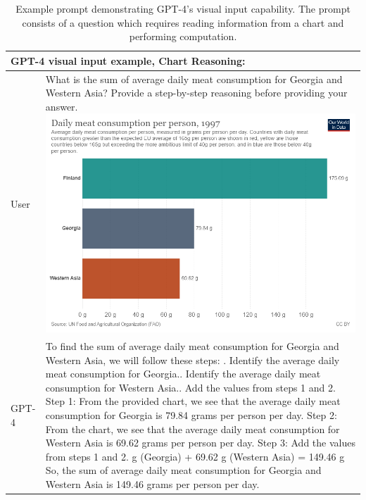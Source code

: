 \documentclass{article}
\begin{document}
\begin{table}
\begin{tabular}[]{p{0.5in}p{4.5in}}
\toprule
\multicolumn{2}{p{5in}}{
\textbf{GPT-4 visual input example, Chart Reasoning}:}\\
\midrule
User & What is the sum of average daily meat consumption for Georgia and Western Asia? Provide a step-by-step reasoning before providing your answer.\newline\newline
\includegraphics[width=0.8\linewidth]{assets/meat-consumption.png}\newline
\\
GPT-4 & To find the sum of average daily meat consumption for Georgia and Western Asia, we will follow these steps:\newline
\newline
1. Identify the average daily meat consumption for Georgia.\newline
2. Identify the average daily meat consumption for Western Asia.\newline
3. Add the values from steps 1 and 2.\newline
\newline
Step 1: From the provided chart, we see that the average daily meat consumption for Georgia is 79.84 grams per person per day.\newline
Step 2: From the chart, we see that the average daily meat consumption for Western Asia is 69.62 grams per person per day.\newline
Step 3: Add the values from steps 1 and 2.\newline
79.84 g (Georgia) + 69.62 g (Western Asia) = 149.46 g\newline
\newline
So, the sum of average daily meat consumption for Georgia and Western Asia is 149.46 grams per person per day.\\
\bottomrule
\end{tabular}
\caption{Example prompt demonstrating GPT-4's visual input capability. The prompt consists of a question which requires reading information from a chart and performing computation.}
\label{table:visual_input_chart}
\end{table}
\end{document}
